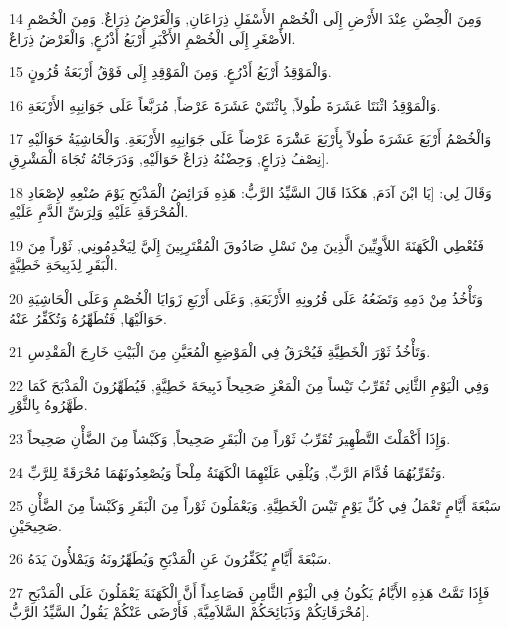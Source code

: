 \par 14 وَمِنَ الْحِضْنِ عِنْدَ الأَرْضِ إِلَى الْخُصْمِ الأَسْفَلِ ذِرَاعَانِ, وَالْعَرْضُ ذِرَاعٌ. وَمِنَ الْخُصْمِ الأَصْغَرِ إِلَى الْخُصْمِ الأَكْبَرِ أَرْبَعُ أَذْرُعٍ, وَالْعَرْضُ ذِرَاعٌ.
\par 15 وَالْمَوْقِدُ أَرْبَعُ أَذْرُعٍ. وَمِنَ الْمَوْقِدِ إِلَى فَوْقُ أَرْبَعَةُ قُرُونٍ.
\par 16 وَالْمَوْقِدُ اثْنَتَا عَشَرَةَ طُولاً, بِاثْنَتَيْ عَشَرَةَ عَرْضاً, مُرَبَّعاً عَلَى جَوَانِبِهِ الأَرْبَعَةِ.
\par 17 وَالْخُصْمُ أَرْبَعَ عَشَرَةَ طُولاً بِأَرْبَعَ عَشَْرَةَ عَرْضاً عَلَى جَوَانِبِهِ الأَرْبَعَةِ. وَالْحَاشِيَةُ حَوَالَيْهِ نِصْفُ ذِرَاعٍ, وَحِضْنُهُ ذِرَاعٌ حَوَالَيْهِ, وَدَرَجَاتُهُ تُجَاهَ الْمَشْرِقِ].
\par 18 وَقَالَ لِي: [يَا ابْنَ آدَمَ, هَكَذَا قَالَ السَّيِّدُ الرَّبُّ: هَذِهِ فَرَائِضُ الْمَذْبَحِ يَوْمَ صُنْعِهِ لإِصْعَادِ الْمُحْرَقَةِ عَلَيْهِ وَلِرَشِّ الدَّمِ عَلَيْهِ.
\par 19 فَتُعْطِي الْكَهَنَةَ اللاَّوِيِّينَ الَّذِينَ مِنْ نَسْلِ صَادُوقَ الْمُقْتَرِبِينَ إِلَيَّ لِيَخْدِمُونِي, ثَوْراً مِنَ الْبَقَرِ لِذَبِيحَةِ خَطِيَّةٍ.
\par 20 وَتَأْخُذُ مِنْ دَمِهِ وَتَضَعُهُ عَلَى قُرُونِهِ الأَرْبَعَةِ, وَعَلَى أَرْبَعِ زَوَايَا الْخُصْمِ وَعَلَى الْحَاشِيَةِ حَوَالَيْهَا, فَتُطَهِّرُهُ وَتُكَفِّرُ عَنْهُ.
\par 21 وَتَأْخُذُ ثَوْرَ الْخَطِيَّةِ فَيُحْرَقُ فِي الْمَوْضِعِ الْمُعَيَّنِ مِنَ الْبَيْتِ خَارِجَ الْمَقْدِسِ.
\par 22 وَفِي الْيَوْمِ الثَّانِي تُقَرِّبُ تَيْساً مِنَ الْمَعْزِ صَحِيحاً ذَبِيحَةَ خَطِيَّةٍ, فَيُطَهِّرُونَ الْمَذْبَحَ كَمَا طَهَّرُوهُ بِالثَّوْرِ.
\par 23 وَإِذَا أَكْمَلْتَ التَّطْهِيرَ تُقَرِّبُ ثَوْراً مِنَ الْبَقَرِ صَحِيحاً, وَكَبْشاً مِنَ الضَّأْنِ صَحِيحاً.
\par 24 وَتُقَرِّبُهُمَا قُدَّامَ الرَّبِّ, وَيُلْقِي عَلَيْهِمَا الْكَهَنَةُ مِلْحاً وَيُصْعِدُونَهُمَا مُحْرَقَةً لِلرَّبِّ.
\par 25 سَبْعَةَ أَيَّامٍ تَعْمَلُ فِي كُلِّ يَوْمٍ تَيْسَ الْخَطِيَّةِ. وَيَعْمَلُونَ ثَوْراً مِنَ الْبَقَرِ وَكَبْشاً مِنَ الضَّأْنِ صَحِيحَيْنِ.
\par 26 سَبْعَةَ أَيَّامٍ يُكَفِّرُونَ عَنِ الْمَذْبَحِ وَيُطَهِّرُونَهُ وَيَمْلأُونَ يَدَهُ.
\par 27 فَإِذَا تَمَّتْ هَذِهِ الأَيَّامُ يَكُونُ فِي الْيَوْمِ الثَّامِنِ فَصَاعِداً أَنَّ الْكَهَنَةَ يَعْمَلُونَ عَلَى الْمَذْبَحِ مُحْرَقَاتِكُمْ وَذَبَائِحَكُمْ السَّلاَمِيَّةَ, فَأَرْضَى عَنْكُمْ يَقُولُ السَّيِّدُ الرَّبُّ].

